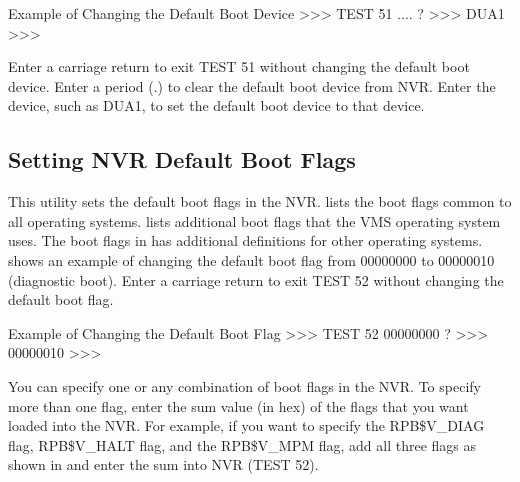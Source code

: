 \begin{ttfig}{Example of Changing the Default Boot Device}
>>> TEST 51
    .... ? >>> DUA1
>>>
\end{ttfig}

Enter a carriage return to exit TEST 51 without changing the default boot
device. Enter a period (.) to clear the default boot device from NVR. Enter
the device, such as DUA1, to set the default boot device to that device.

\subsection{Setting NVR Default Boot Flags}

This utility sets the default boot flags in the NVR.  lists the boot
flags common to all operating systems.  lists additional boot
flags that the VMS operating system uses. The boot flags in 
has additional definitions for other operating systems.  shows
an example of changing the default boot flag from 00000000 to 00000010
(diagnostic boot). Enter a carriage return to exit TEST 52 without changing
the default boot flag.

\begin{ttfig}{Example of Changing the Default Boot Flag}
>>> TEST 52
    00000000 ? >>> 00000010
>>>
\end{ttfig}

You can specify one or any combination of boot flags in the NVR. To specify
more than one flag, enter the sum value (in hex) of the flags that you want
loaded into the NVR. For example, if you want to specify the RPB\$V\_DIAG
flag, RPB\$V\_HALT flag, and the RPB\$V\_MPM flag, add all three flags as
shown in  and enter the sum into NVR (TEST 52).


